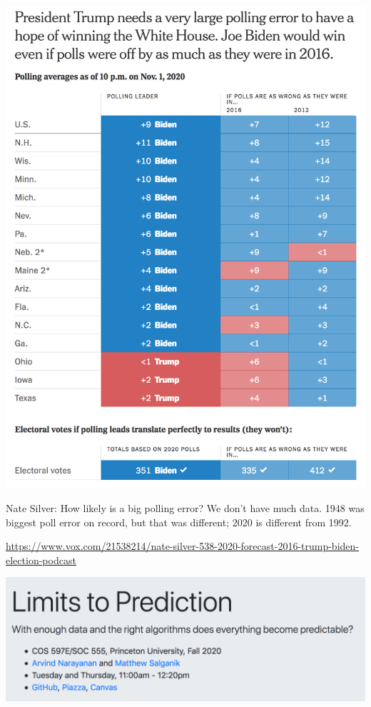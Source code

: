 \documentclass[aspectratio=169]{beamer}
\begin{document}
\begin{frame}

\begin{center}
  \includegraphics[height = 0.7\textheight]{figures/cohn_what_2020_table}
\end{center}

\pause

Nate Silver: How likely is a big polling error?  We don't have much data. 1948 was biggest poll error on record, but that was different; 2020 is different from 1992.

\vfill
\tiny{\url{https://www.vox.com/21538214/nate-silver-538-2020-forecast-2016-trump-biden-election-podcast}}

\end{frame}
\begin{frame}

\begin{center}
  \includegraphics[width = \textwidth]{figures/class_hero}
\end{center}

\end{frame}
\frame{\titlepage}
\end{document}
